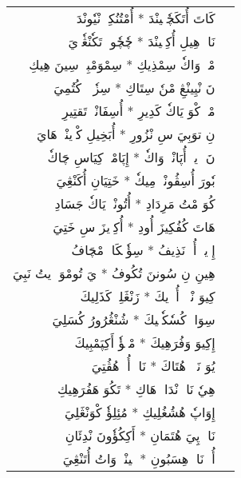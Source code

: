 \documentclass[a4paper, 12pt]{report}
\begin{document}
\begin{longtable}{rl}
\textarabic{كَاتَ أُتَكَچٗپٖينْدَ  *  أُمْتُنُكِيٖ نْيٗونْدَ} & \\ 
\textarabic{نَاوٖ هِيلِ أُكِتٖينْدَ  *  چٗچٗوتٖ تَكٗنْڠٗوٖيَ} & \\ 
[8mm] 

\textarabic{مْكٖ وَاكٗ سِمْذِيكِ  *  سِمْوَمْبِيٖ سِينَ هِيكِ} & \\ 
\textarabic{نَ نْيِينْڠِ مْنٗ سِتَاكِ  *  سِزٗوٖيٖ كُتُمِيَ} & \\ 
[8mm] 

\textarabic{مْپٖ كْوَ يَاكٗ كَدِيرِ  *  أُسِفَانْيٖ تَقتِيرِ} & \\ 
\textarabic{نِ توَبِيَ سِ نْزُورِ  *  أُبَخِيلِ كْوٖينْيٖ هَايَ} & \\ 
[8mm] 

\textarabic{نَ وٖيوٖ أُپَانْدٖ وَاكٗ  *  إِپَامْبٖ كِيَاسِ چَاكٗ} & \\ 
\textarabic{بٗورَ أُسِڤُونْدٖ مِيكٗ  *  خَتِيَانِ أُكَنْڠِيَ} & \\ 
[8mm] 

\textarabic{كُوَ مْتُ مَرِدَادِ  *  أُتُونْڠٖ يَاكٗ جَسَادِ} & \\ 
\textarabic{هَاتَ كُفُكِيزَ أُودِ  *  أُكِوٖيزَ سِ خَتِيَ} & \\ 
[8mm] 

\textarabic{إِوٖيكٖ أُوٖ نَذِيفُ  *  سِؤٗنٖكَانٖ مْچَافُ} & \\ 
\textarabic{هِينِ نِ سُوننَ تُكُوفُ  *  يَ تُومْوَ وٖيتُ نَبِيَ} & \\ 
[8mm] 

\textarabic{كِيوَ نْيٖئٖ أُمٖوٖيكَ  *  زَنْڠَلِيٖ كَذَلِيكَ} & \\ 
\textarabic{سِوَاتٖ كُسٗكٗتٖيكَ  *  شُنْڠُرُورُ كُسَلِيَ} & \\ 
[8mm] 

\textarabic{إِكِيوَ وَفُرَهِيكَ  *  مْكٖؤٗ أَكِپَمْبِيكَ} & \\ 
\textarabic{يُوَ نَيٖيٖ هُتَاكَ  *  نَاوٖ أُوٖ هُڤُتِيَ} & \\ 
[8mm] 

\textarabic{هِيٗ نَايٖ نْدَاكٖ هَاكِ  *  تَكُوَ هَفُرَهِيكِ} & \\ 
\textarabic{إِوَاپٗ هُشُغُلِيكِ  *  مُئِلِؤٗ كْوَنْڠَلِيَ} & \\ 
[8mm] 

\textarabic{نَايٖ پِيَ هُتَمَانِ  *  أَكِكُؤٗونَ نْدِئَانِ} & \\ 
\textarabic{أُوٖ نَاوٖ هِسَبُونِ  *  پٖينْيٖ وَاتُ أُتَنْڠِيَ} & \\ 
[8mm] 


\end{longtable}
\end{document}
